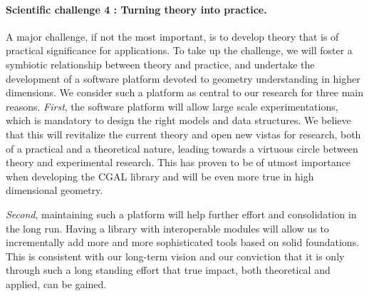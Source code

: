 


\paragraph{Scientific challenge 4 : Turning theory into practice.}%
A major challenge, if not the most important, is to develop theory that is of practical significance for applications.   To take up the challenge, we will foster a symbiotic relationship between theory and practice, and  undertake the development of a software platform devoted to geometry understanding in higher dimensions. 
We consider such a platform as central to our research  for three main reasons.  {\em First}, the software platform will allow large scale experimentations, which is mandatory to design the right models and data structures. We believe that this will revitalize the current theory and open new vistas for research, both of a practical and a theoretical nature, leading towards a virtuous circle between theory and experimental research. This has proven to be of utmost importance
when developing the CGAL library and will be even more true in high dimensional geometry.

{\em Second}, maintaining such a platform will help further effort and consolidation in the long run.  Having a library with interoperable modules will allow us to incrementally add more and more sophisticated tools based on solid foundations.  This is consistent with our long-term vision and our conviction that it is only through such a long standing effort that true impact, both theoretical and applied, can be gained.

